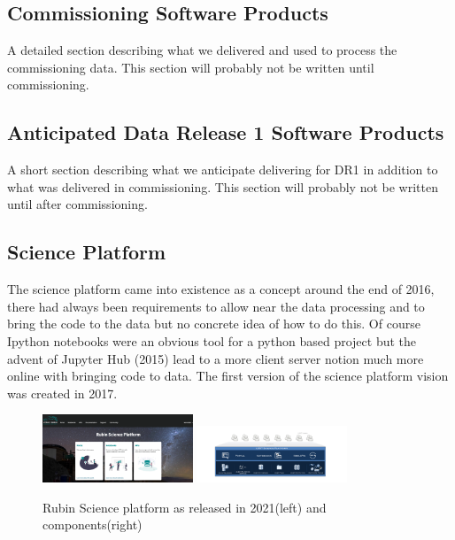 \subsection{Commissioning Software Products}
A detailed section describing what we delivered and used to process the commissioning data.
This section will probably not be written until  commissioning.

\subsection{Anticipated Data Release 1 Software Products}
A short section describing what we anticipate delivering  for DR1 in addition to what was delivered in commissioning.
This section will probably not be written until after commissioning.

\subsection{Science Platform}\label{sec:sciplat}
The science platform came into existence as a concept around the end of 2016, there had always been requirements to allow near the data processing and to  bring the code to the data but no concrete idea of how to do this. Of course Ipython notebooks were an obvious tool for a python based project but the advent of  Jupyter Hub  (2015) lead to a more client server notion much more online with bringing code to data. The first version of the science platform vision\cite{LSE-319} was created in 2017.

\begin{figure}
\begin{centering}
\includegraphics[width=0.4\textwidth]{images/datacloud}
\includegraphics[width=0.4\textwidth]{images/fig-lsst-science-platform}
	\caption{Rubin Science platform as released in 2021(left) and components(right) \label{fig:sciplat}}
\end{centering}
\end{figure}

